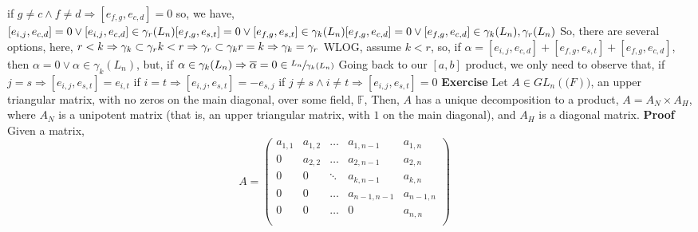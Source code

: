 \documentclass[12pt]{article}
\begin{document}
\newline
if $g \neq c \land f \neq d \Rightarrow [e_{f,g},e_{c,d}]=0$ \newline
\newline
so, we have, \newline
$[e_{i,j},e_{c,d}]=0 \lor [e_{i,j},e_{c,d}] \in \gamma_{r}(L_n) \newline 
[e_{f,g},e_{s,t}]=0 \lor
[e_{f,g},e_{s,t}] \in \gamma_{k}(L_n)  \newline
[e_{f,g},e_{c,d}]=0 \lor
[e_{f,g},e_{c,d}] \in \gamma_{k}(L_n),\gamma_{r}(L_n) \newline
$ \newline
So, there are several options, here, \newline
$r<k \Rightarrow \gamma_k \subset \gamma_r \newline
k<r \Rightarrow \gamma_r \subset \gamma_k \newline
r=k \Rightarrow \gamma_k=\gamma_r$ \newline
WLOG, assume $k<r$, so, if $\alpha=[e_{i,j},e_{c,d}]+
[e_{f,g},e_{s,t}]+
[e_{f,g},e_{c,d}]$, then $\alpha=0 \lor \alpha \in \gamma_k(L_n)$, but, if $\alpha \in \gamma_k(L_n) \Rightarrow \overline{\alpha}=0 \in \sfrac{L_n}{\gamma_k(L_n)}$ \newline
Going back to our $[a,b]$ product, we only need to observe that, \newline
if $j=s \Rightarrow [e_{i,j},e_{s,t}]=e_{i,t}$ \newline
if $i=t \Rightarrow [e_{i,j},e_{s,t}]=-e_{s,j}$ \newline
if $j \neq s \land i \neq t \Rightarrow [e_{i,j},e_{s,t}]=0$
\newpage
\textbf{Exercise} \newline
Let $A \in GL_n(\mathbb(F))$, an upper triangular matrix, with no zeros on the main diagonal, over some field, $\mathbb{F}$, Then, \newline
$A$ has a unique decomposition to a product, $A=A_N \times A_H$, where $A_N$ is a unipotent matrix (that is, an upper triangular matrix, with $1$ on the main diagonal), and $A_H$ is a diagonal matrix. \newline
\newline
\textbf{Proof} \newline
Given a matrix, 
$$
	A=\begin{pmatrix} 
	a_{1,1} & a_{1,2} & \dots & a_{1,n-1} & a_{1,n} \\
	0 & a_{2,2} & \dots & a_{2,n-1} & a_{2,n} \\
	0 & 0 & \ddots & a_{k,n-1} & a_{k,n} \\
	0 & 0 & \dots & a_{n-1,n-1} & a_{n-1,n} \\
	0 & 0 & \dots & 0 & a_{n,n} \\
	\end{pmatrix}
	\quad
	$$
\end{document}

